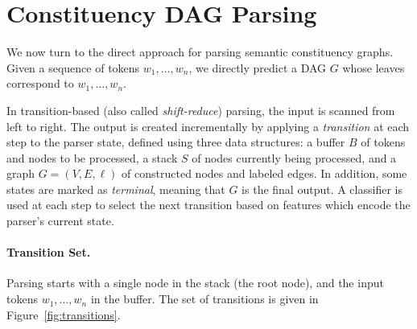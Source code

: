 \documentclass[11pt]{article}
\newcommand{\figref}[1]{Figure~\ref{#1}}
\begin{document}
\section{Constituency DAG Parsing}\label{sec:direct_approach}

We now turn to the direct approach for parsing semantic constituency graphs. Given a sequence
of tokens $w_1, \ldots, w_n$, we directly predict a DAG $G$ whose leaves
correspond to  $w_1, \ldots, w_n$.


In transition-based (also called \textit{shift-reduce}) parsing, the input is scanned from left to right.
The output is created incrementally by applying a \textit{transition} at each step to the parser state,
defined using three data structures: a buffer $B$ of tokens and nodes to be processed,
a stack $S$ of nodes currently being processed,
and a graph $G=(V,E,\ell)$ of constructed nodes and labeled edges.
In addition, some states are marked as \textit{terminal}, meaning that $G$ is the final output.
A classifier is used at each step to select the next transition based on features
which encode the parser's current state.

\paragraph{Transition Set.}
Parsing starts with a single node in the stack (the root node), and the input tokens
$w_1, \ldots, w_n$ in the buffer. The set of transitions is given in \figref{fig:transitions}.
\end{document}
